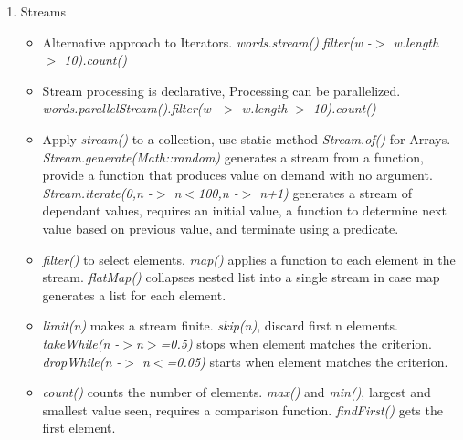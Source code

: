 \documentclass[a4paper]{article}
\begin{document}
\begin{enumerate}
\begin{itemize}
    \end{itemize}
    \item Streams
    \begin{itemize}
        \item Alternative approach to Iterators. \textit{words.stream().filter(w -$>$ w.length $>$ 10).count()}
        \item Stream processing is declarative, Processing can be parallelized.\\
        \textit{words.parallelStream().filter(w -$>$ w.length $>$ 10).count()}
        \item Apply \textit{stream()} to a collection, use static method \textit{Stream.of()} for Arrays. \textit{Stream.generate(Math::random)} generates a stream from a function, provide a function that produces value on demand with no argument. \textit{Stream.iterate(0,n -$>$ n$<$100,n -$>$ n+1)} generates a stream of dependant values, requires an initial value, a function to determine next value based on previous value, and terminate using a predicate.
        \item \textit{filter()} to select elements, \textit{map()} applies a function to each element in the stream. \textit{flatMap()} collapses nested list into a single stream in case map generates a list for each element.
        \item \textit{limit(n)} makes a stream finite. \textit{skip(n)}, discard first n elements. \textit{takeWhile(n -$> $n$>$=0.5)} stops when element matches the criterion. \textit{dropWhile(n -$>$ n$<$=0.05)} starts when element matches the criterion.
        \item \textit{count()} counts the number of elements. \textit{max()} and \textit{min()}, largest and smallest value seen, requires a comparison function. \textit{findFirst()} gets the first element.
    \end{itemize}
\end{enumerate}
\end{document}
